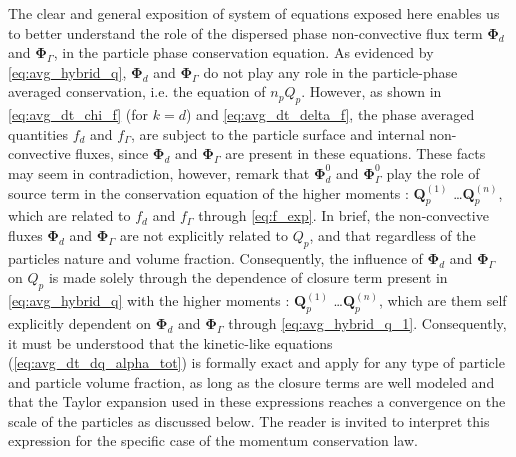 The clear and general exposition of system of equations exposed here enables us to better understand the role of the dispersed phase non-convective flux term $\bm\Phi_d$ and $\bm\Phi_\Gamma$, in the particle phase conservation equation. 
As evidenced by \ref{eq:avg_hybrid_q}, $\bm{\Phi}_d$ and $\bm{\Phi}_\Gamma$ do not play any role in the particle-phase averaged conservation, i.e. the equation of $n_pQ_p$. 
However, as shown in \ref{eq:avg_dt_chi_f} (for $k = d$) and \ref{eq:avg_dt_delta_f}, the phase averaged quantities $f_d$ and $f_\Gamma$, are subject to the particle surface and internal non-convective fluxes, since $\bm{\Phi}_d$ and $\bm{\Phi}_\Gamma$ are present in these equations.
These facts may seem in contradiction, however, remark that $\bm{\Phi}_d^0$ and $\bm{\Phi}_\Gamma^0$ play the role of source term in the conservation equation of the higher moments : $\textbf{Q}^{(1)}_p$ \ldots $\textbf{Q}^{(n)}_p$, which are related to $f_d$ and $f_\Gamma$ through \ref{eq:f_exp}.
In brief, the non-convective fluxes $\bm{\Phi}_d$ and $\bm{\Phi}_\Gamma$  are not explicitly related to $Q_p$, and that regardless of the particles nature and volume fraction. 
Consequently, the influence of $\bm{\Phi}_d$ and $\bm{\Phi}_\Gamma$ on $Q_p$ is made solely through the dependence of closure term present in \ref{eq:avg_hybrid_q} with the higher moments : $\textbf{Q}^{(1)}_p$ \ldots $\textbf{Q}^{(n)}_p$, which are them self explicitly dependent on $\bm{\Phi}_d$ and $\bm{\Phi}_\Gamma$ through \ref{eq:avg_hybrid_q_1}. 
Consequently, it must be understood that the kinetic-like equations (\ref{eq:avg_dt_dq_alpha_tot}) is formally exact and apply for any type of particle and particle volume fraction, as long as the closure terms are well modeled and that the Taylor expansion used in these expressions reaches a convergence on the scale of the particles as discussed below.
The reader is invited to interpret this expression for the specific case of the momentum conservation law. 




